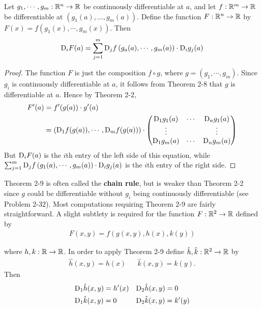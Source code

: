 \begin{theorem}
    Let $g_1, \cdots, g_m:\mathbb{R}^n\to \mathbb{R}$ be continuously differentiable at $a$, and 
    let $f:\mathbb{R}^m\to \mathbb{R}$ be differentiable at $\left(g_1(a), \dots, g_m(a)\right)$. 
    Define the function $F:\mathbb{R}^n\to \mathbb{R}$ by $F(x) = f\left(g_1(x), \cdots, g_m(x)\right)$. Then 
    \begin{align*}
        \mathrm{D}_iF(a) = \sum_{j=1}^{m}{\mathrm{D}_jf\left(g_a(a), \cdots, g_m(a)\right)\cdot \mathrm{D}_ig_j(a)}
    \end{align*}
\end{theorem}

\begin{proof}
    The function $F$ is just the composition $f\circ g$, where $g = (g_1,\cdots,g_m)$.
    Since $g_i$ is continuously differentiable at $a$, it follows from Theorem 2-8 
    that $g$ is differentiable at $a$. Hence by Theorem 2-2,
    \begin{align*}
        F'(a) 
        & = f'(g(a)) \cdot g'(a) \\
        & = \left(\mathrm{D}_1f(g(a)), \cdots, \mathrm{D}_mf(g(a))\right)\cdot 
            \left(\begin{matrix}
                \mathrm{D}_1g_1(a) & \cdots & \mathrm{D}_ng_1(a) \\
                \vdots & & \vdots \\
                \mathrm{D}_1g_m(a) & \cdots & \mathrm{D}_ng_m(a)
            \end{matrix}\right)
    \end{align*}
    But $\mathrm{D}_iF(a)$ is the $i$th entry of the left side of this equation, while 
    $\sum_{j=1}^{m }{\mathrm{D}_jf\left(g_1(a), \cdots, g_m(a)\right)}\cdot \mathrm{D}_ig_j(a)$ is the $i$th 
    entry of the right side.
\end{proof}

Theorem 2-9 is often called the \textbf{chain rule}, but is weaker
than Theorem 2-2 since $g$ could be differentiable without $g_i$
being continuously differentiable (see Problem 2-32).
Most computations requiring Theorem 2-9 are fairly straightforward.
A slight subtlety is required for the function $F:\mathbb{R}^2\to \mathbb{R}$
defined by 
\begin{align*}
    F(x, y) = f\left(g(x, y), h(x), k(y)\right)
\end{align*}

where $h, k:\mathbb{R}\to \mathbb{R}$. In order to apply Theorem 2-9 define $\hat{h}, \hat{k}:\mathbb{R}^2\to \mathbb{R}$ by 
\begin{align*}
    \hat{h}(x, y) = h(x) & & \hat{k}(x, y) = k(y).
\end{align*}
Then 
\begin{align*}
    & \mathrm{D}_1\hat{h}(x, y) = h'(x) && \mathrm{D}_2\hat{h}(x, y) = 0 \\
    & \mathrm{D}_1\hat{k}(x, y) = 0 && \mathrm{D}_2\hat{k}(x, y) = k'(y)
\end{align*}

